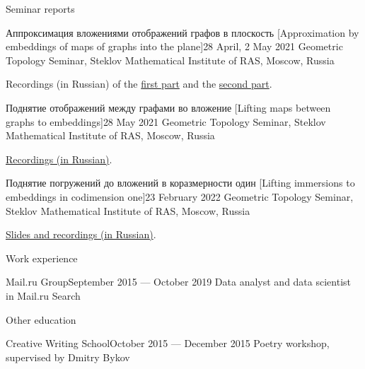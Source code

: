\documentclass{resume}
\begin{document}
\begin{rSection}{Seminar reports}
  \begin{rSubsection}{Аппроксимация вложениями отображений графов в плоскость [Approximation by embeddings of maps of graphs into the plane]}{28 April, 2 May 2021}{}
    Geometric Topology Seminar, Steklov Mathematical Institute of RAS, Moscow, Russia
    \vspace{0.5em}

    Recordings (in Russian) of the
    \href{http://www.mathnet.ru/php/seminars.phtml?option_lang=eng&presentid=30406}{first part} and
    the \href{http://www.mathnet.ru/php/seminars.phtml?option_lang=eng&presentid=30482}{second part}.
  \end{rSubsection}

  \begin{rSubsection}{Поднятие отображений между графами во вложение [Lifting maps between graphs to embeddings]}{28 May 2021}{}
    Geometric Topology Seminar, Steklov Mathematical Institute of RAS, Moscow, Russia
    \vspace{0.5em}

    \href{http://www.mathnet.ru/php/seminars.phtml?option_lang=eng&presentid=30731}{Recordings (in Russian)}.
  \end{rSubsection}

  \begin{rSubsection}{Поднятие погружений до вложений в коразмерности один [Lifting immersions to embeddings in codimension one]}{23 February 2022}{}
    Geometric Topology Seminar, Steklov Mathematical Institute of RAS, Moscow, Russia
    \vspace{0.5em}

    \href{http://www.mathnet.ru/php/seminars.phtml?option_lang=eng&presentid=34048}{Slides and recordings (in Russian)}.
  \end{rSubsection}
\end{rSection}

\begin{rSection}{Work experience}
  \begin{rSubsection}{Mail.ru Group}{September 2015 --- October 2019}{}
    Data analyst and data scientist in Mail.ru Search
  \end{rSubsection}
\end{rSection}

\begin{rSection}{Other education}
  \begin{rSubsection}{Creative Writing School}{October 2015 --- December 2015}{} 
    Poetry workshop, supervised by Dmitry Bykov
  \end{rSubsection}
\end{rSection}
\end{document}
